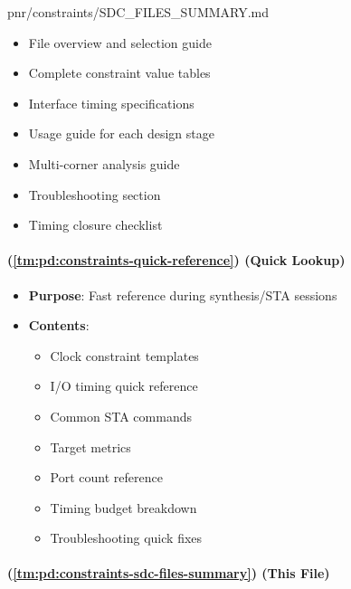 \begin{relocated}{pnr/constraints/SDC_FILES_SUMMARY.md}
\begin{itemize}
  \begin{itemize}
  \tightlist
  \item
    File overview and selection guide
  \item
    Complete constraint value tables
  \item
    Interface timing specifications
  \item
    Usage guide for each design stage
  \item
    Multi-corner analysis guide
  \item
    Troubleshooting section
  \item
    Timing closure checklist
  \end{itemize}
\end{itemize}

\paragraph{\texorpdfstring{ (\cref{tm:pd:constraints-quick-reference}) (Quick
Lookup)}{ (Quick Lookup)}}\label{tm:pd:constraints-sdc-files-summary:quick-referencemd-quick-lookup}

\begin{itemize}
\tightlist
\item
  \textbf{Purpose}: Fast reference during synthesis/\allowbreak{}STA
  sessions
\item
  \textbf{Contents}:

  \begin{itemize}
  \tightlist
  \item
    Clock constraint templates
  \item
    I/O timing quick reference
  \item
    Common STA commands
  \item
    Target metrics
  \item
    Port count reference
  \item
    Timing budget breakdown
  \item
    Troubleshooting quick fixes
  \end{itemize}
\end{itemize}

\paragraph{\texorpdfstring{ (\cref{tm:pd:constraints-sdc-files-summary}) (This
File)}{ (This File)}}\label{tm:pd:constraints-sdc-files-summary:sdc-files-summarymd-this-file}


\end{relocated}
